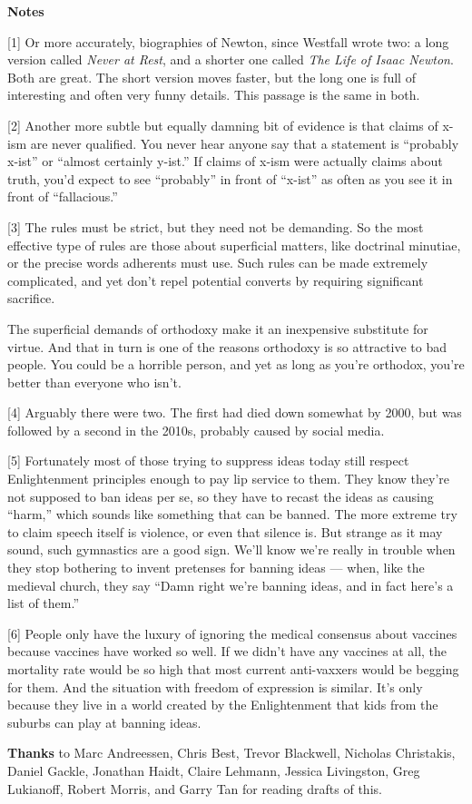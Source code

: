 \textbf{Notes}

{[}1{]} Or more accurately, biographies of Newton, since Westfall wrote
two: a long version called \emph{Never at Rest}, and a shorter one
called \emph{The Life of Isaac Newton}. Both are great. The short
version moves faster, but the long one is full of interesting and often
very funny details. This passage is the same in both.

{[}2{]} Another more subtle but equally damning bit of evidence is that
claims of x-ism are never qualified. You never hear anyone say that a
statement is ``probably x-ist'' or ``almost certainly y-ist.'' If claims
of x-ism were actually claims about truth, you'd expect to see
``probably'' in front of ``x-ist'' as often as you see it in front of
``fallacious.''

{[}3{]} The rules must be strict, but they need not be demanding. So the
most effective type of rules are those about superficial matters, like
doctrinal minutiae, or the precise words adherents must use. Such rules
can be made extremely complicated, and yet don't repel potential
converts by requiring significant sacrifice.

The superficial demands of orthodoxy make it an inexpensive substitute
for virtue. And that in turn is one of the reasons orthodoxy is so
attractive to bad people. You could be a horrible person, and yet as
long as you're orthodox, you're better than everyone who isn't.

{[}4{]} Arguably there were two. The first had died down somewhat by
2000, but was followed by a second in the 2010s, probably caused by
social media.

{[}5{]} Fortunately most of those trying to suppress ideas today still
respect Enlightenment principles enough to pay lip service to them. They
know they're not supposed to ban ideas per se, so they have to recast
the ideas as causing ``harm,'' which sounds like something that can be
banned. The more extreme try to claim speech itself is violence, or even
that silence is. But strange as it may sound, such gymnastics are a good
sign. We'll know we're really in trouble when they stop bothering to
invent pretenses for banning ideas --- when, like the medieval church,
they say ``Damn right we're banning ideas, and in fact here's a list of
them.''

{[}6{]} People only have the luxury of ignoring the medical consensus
about vaccines because vaccines have worked so well. If we didn't have
any vaccines at all, the mortality rate would be so high that most
current anti-vaxxers would be begging for them. And the situation with
freedom of expression is similar. It's only because they live in a world
created by the Enlightenment that kids from the suburbs can play at
banning ideas.

\textbf{Thanks} to Marc Andreessen, Chris Best, Trevor Blackwell,
Nicholas Christakis, Daniel Gackle, Jonathan Haidt, Claire Lehmann,
Jessica Livingston, Greg Lukianoff, Robert Morris, and Garry Tan for
reading drafts of this.

